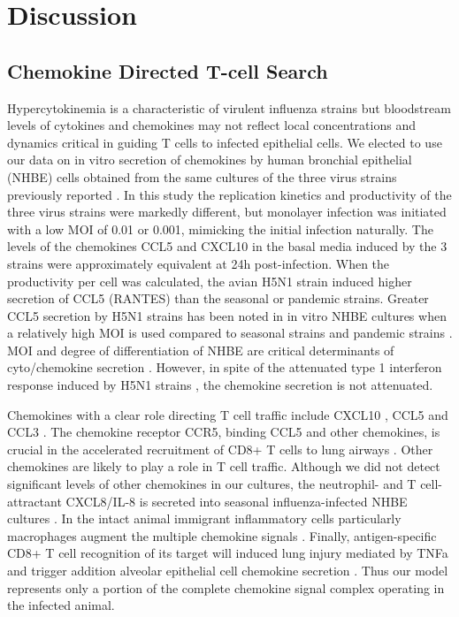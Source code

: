 \documentclass[10pt]{article}
\begin{document}
\section*{Discussion}


\subsection*{Chemokine Directed T-cell Search}

Hypercytokinemia is a characteristic of virulent influenza strains \cite{DeJong2006} but bloodstream levels of cytokines and chemokines may not reflect local concentrations and dynamics critical in guiding T cells to infected epithelial cells.  We elected to use our data on in vitro secretion of chemokines by human bronchial epithelial (NHBE) cells obtained from the same cultures of the three virus strains previously reported \cite{Mitchell2011}.  In this study the replication kinetics and productivity of the three virus strains were markedly different, but monolayer infection was initiated with a low MOI of 0.01 or 0.001, mimicking the initial infection naturally.  The levels of the chemokines CCL5 and CXCL10 in the basal media induced by the 3 strains were approximately equivalent at 24h post-infection.  When the productivity per cell was calculated, the avian H5N1 strain induced higher secretion of CCL5 (RANTES) than the seasonal or pandemic strains.  Greater CCL5 secretion by H5N1 strains has been noted in in vitro NHBE cultures when a relatively high MOI is used compared to seasonal strains \cite{Chan2005, Chan2010, Zeng2011} and pandemic strains \cite{Zeng2011}.  MOI and degree of differentiation of NHBE are critical determinants of cyto/chemokine secretion \cite{Chan2010}.  However, in spite of the attenuated type 1 interferon response induced by H5N1 strains \cite{Zeng2007}, the chemokine secretion is not attenuated.

Chemokines with a clear role directing T cell traffic include CXCL10 \cite{Dufour2002}, CCL5 \cite{Kawai1999} and CCL3 \cite{Kawai1999}.  The chemokine receptor CCR5, binding CCL5 and other chemokines, is crucial in the accelerated recruitment of CD8+ T cells to lung airways \cite{Kohlmeier2008}.  Other chemokines are likely to play a role in T cell traffic.  Although we did not detect significant levels of other chemokines in our cultures, the neutrophil- and T cell-attractant CXCL8/IL-8 is secreted into seasonal influenza-infected NHBE cultures \cite{Matsukura1996, Arndt2002}.  In the intact animal immigrant inflammatory cells particularly macrophages augment the multiple chemokine signals \cite{Julkunen2000}.  Finally, antigen-specific CD8+ T cell recognition of its target will induced lung injury mediated by TNFa and trigger addition alveolar epithelial cell chemokine secretion \cite{Zhao2000}.   Thus our model represents only a portion of the complete chemokine signal complex operating in the infected animal.
\end{document}
